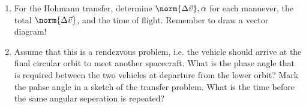 \documentclass[10pt]{article}
\theoremstyle{definition}
\newenvironment{subprob}%
{\renewcommand{\theenumi}{\alph{enumi}}\renewcommand{\labelenumi}{(\theenumi)}\begin{enumerate}}%
{\end{enumerate}}%
\begin{document}
\begin{subprob}
\item For the Hohmann transfer, determine \( \norm{\Delta \vec v}, \alpha \) for each manuever, the total \( \norm{\Delta \vec v}\), and the time of flight. 
    Remember to draw a vector diagram!
\item Assume that this is a rendezvous problem, i.e. the vehicle should arrive at the final circular orbit to meet another spacecraft.
    What is the phase angle that is required between the two vehicles at departure from the lower orbit?
    Mark the pahse angle in a sketch of the transfer problem.
    What is the time before the same angular seperation is repeated?
\end{subprob}
\end{document}
